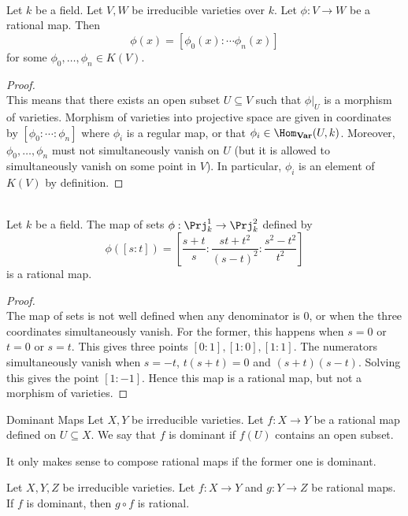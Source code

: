 \documentclass[a4paper]{article}
\begin{document}
\begin{lmm}{}{}\\
Let $k$ be a field. Let $V,W$ be irreducible varieties over $k$. Let $\phi:V\to W$ be a rational map. Then $$\phi(x)=[\phi_0(x):\cdots\phi_n(x)]$$ for some $\phi_0,\dots,\phi_n\in K(V)$. 
\begin{proof}\\
This means that there exists an open subset $U\subseteq V$ such that $\phi|_U$ is a morphism of varieties. Morphism of varieties into projective space are given in coordinates by $[\phi_0:\cdots:\phi_n]$ where $\phi_i$ is a regular map, or that $\phi_i\in\Hom_\bold{Var}(U,k)$. Moreover, $\phi_0,\dots,\phi_n$ must not simultaneously vanish on $U$ (but it is allowed to simultaneously vanish on some point in $V$). In particular, $\phi_i$ is an element of $K(V)$ by definition. 
\end{proof}
\end{lmm}

\begin{eg}{}{}\\
Let $k$ be a field. The map of sets $\phi:\Prj_k^1\to\Prj_k^2$ defined by $$\phi([s:t])=\left[\frac{s+t}{s}:\frac{st+t^2}{(s-t)^2}:\frac{s^2-t^2}{t^2}\right]$$ is a rational map. 
\begin{proof}\\
The map of sets is not well defined when any denominator is $0$, or when the three coordinates simultaneously vanish. For the former, this happens when $s=0$ or $t=0$ or $s=t$. This gives three points $[0:1],[1:0],[1:1]$. The numerators simultaneously vanish when $s=-t$, $t(s+t)=0$ and $(s+t)(s-t)$. Solving this gives the point $[1:-1]$. Hence this map is a rational map, but not a morphism of varieties. 
\end{proof}
\end{eg}

\begin{defn}{Dominant Maps}{} Let $X,Y$ be irreducible varieties. Let $f:X\to Y$ be a rational map defined on $U\subseteq X$. We say that $f$ is dominant if $f(U)$ contains an open subset. 
\end{defn}

It only makes sense to compose rational maps if the former one is dominant. 

\begin{prp}{}{} Let $X,Y,Z$ be irreducible varieties. Let $f:X\to Y$ and $g:Y\to Z$ be rational maps. If $f$ is dominant, then $g\circ f$ is rational. 
\end{prp}
\end{document}
